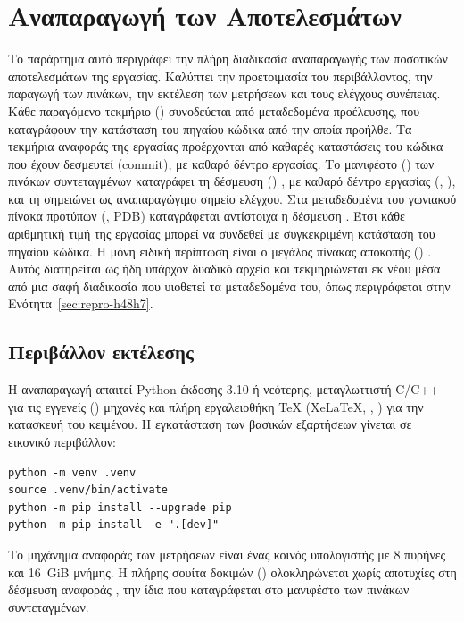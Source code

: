 \chapter{Αναπαραγωγή των Αποτελεσμάτων}
\label{app:repro}

Το παράρτημα αυτό περιγράφει την πλήρη διαδικασία αναπαραγωγής των ποσοτικών αποτελεσμάτων της εργασίας. Καλύπτει την προετοιμασία του περιβάλλοντος, την παραγωγή των πινάκων, την εκτέλεση των μετρήσεων και τους ελέγχους συνέπειας. Κάθε παραγόμενο τεκμήριο () συνοδεύεται από μεταδεδομένα προέλευσης, που καταγράφουν την κατάσταση του πηγαίου κώδικα από την οποία προήλθε. Τα τεκμήρια αναφοράς της εργασίας προέρχονται από καθαρές καταστάσεις του κώδικα που έχουν δεσμευτεί (commit), με καθαρό δέντρο εργασίας. Το μανιφέστο () των πινάκων συντεταγμένων καταγράφει τη δέσμευση () , με καθαρό δέντρο εργασίας (, ), και τη σημειώνει ως αναπαραγώγιμο σημείο ελέγχου. Στα μεταδεδομένα του γωνιακού πίνακα προτύπων (, PDB) καταγράφεται αντίστοιχα η δέσμευση . Έτσι κάθε αριθμητική τιμή της εργασίας μπορεί να συνδεθεί με συγκεκριμένη κατάσταση του πηγαίου κώδικα. Η μόνη ειδική περίπτωση είναι ο μεγάλος πίνακας αποκοπής () . Αυτός διατηρείται ως ήδη υπάρχον δυαδικό αρχείο και τεκμηριώνεται εκ νέου μέσα από μια σαφή διαδικασία που υιοθετεί τα μεταδεδομένα του, όπως περιγράφεται στην Ενότητα~\ref{sec:repro-h48h7}.

\section{Περιβάλλον εκτέλεσης}
\label{sec:repro-env}

Η αναπαραγωγή απαιτεί Python έκδοσης 3.10 ή νεότερης, μεταγλωττιστή C/C++ για τις εγγενείς () μηχανές και πλήρη εργαλειοθήκη TeX (XeLaTeX, , ) για την κατασκευή του κειμένου. Η εγκατάσταση των βασικών εξαρτήσεων γίνεται σε εικονικό περιβάλλον:

\begin{verbatim}
python -m venv .venv
source .venv/bin/activate
python -m pip install --upgrade pip
python -m pip install -e ".[dev]"
\end{verbatim}

Το μηχάνημα αναφοράς των μετρήσεων είναι ένας κοινός υπολογιστής με 8 πυρήνες και 16~GiB μνήμης. Η πλήρης σουίτα δοκιμών () ολοκληρώνεται χωρίς αποτυχίες στη δέσμευση αναφοράς , την ίδια που καταγράφεται στο μανιφέστο των πινάκων συντεταγμένων.

